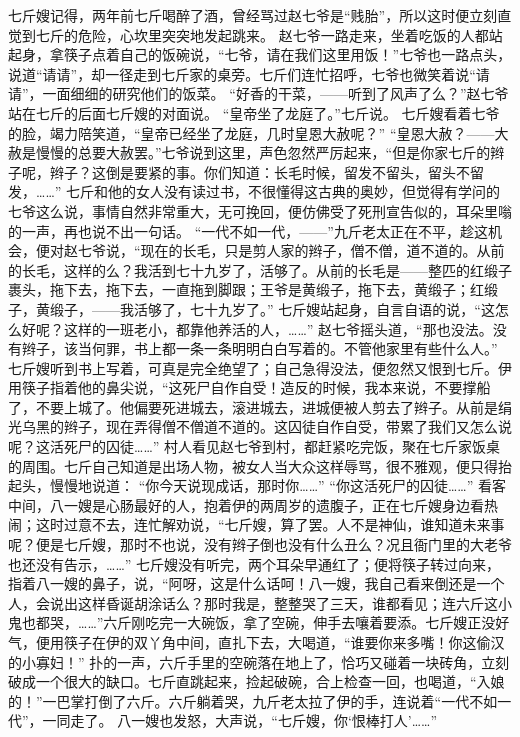 \documentclass[12pt,UTF8]{ctexbook}
\begin{document}
七斤嫂记得，两年前七斤喝醉了酒，曾经骂过赵七爷是“贱胎”，所以这时便立刻直觉到七斤的危险，心坎里突突地发起跳来。
赵七爷一路走来，坐着吃饭的人都站起身，拿筷子点着自己的饭碗说，“七爷，请在我们这里用饭！”七爷也一路点头，说道“请请”，却一径走到七斤家的桌旁。七斤们连忙招呼，七爷也微笑着说“请请”，一面细细的研究他们的饭菜。
“好香的干菜，——听到了风声了么？”赵七爷站在七斤的后面七斤嫂的对面说。
“皇帝坐了龙庭了。”七斤说。
七斤嫂看着七爷的脸，竭力陪笑道，“皇帝已经坐了龙庭，几时皇恩大赦呢？”
“皇恩大赦？——大赦是慢慢的总要大赦罢。”七爷说到这里，声色忽然严厉起来，“但是你家七斤的辫子呢，辫子？这倒是要紧的事。你们知道：长毛时候，留发不留头，留头不留发，……”
七斤和他的女人没有读过书，不很懂得这古典的奥妙，但觉得有学问的七爷这么说，事情自然非常重大，无可挽回，便仿佛受了死刑宣告似的，耳朵里嗡的一声，再也说不出一句话。
“一代不如一代，——”九斤老太正在不平，趁这机会，便对赵七爷说，“现在的长毛，只是剪人家的辫子，僧不僧，道不道的。从前的长毛，这样的么？我活到七十九岁了，活够了。从前的长毛是——整匹的红缎子裹头，拖下去，拖下去，一直拖到脚跟；王爷是黄缎子，拖下去，黄缎子；红缎子，黄缎子，——我活够了，七十九岁了。”
七斤嫂站起身，自言自语的说，“这怎么好呢？这样的一班老小，都靠他养活的人，……”
赵七爷摇头道，“那也没法。没有辫子，该当何罪，书上都一条一条明明白白写着的。不管他家里有些什么人。”
七斤嫂听到书上写着，可真是完全绝望了；自己急得没法，便忽然又恨到七斤。伊用筷子指着他的鼻尖说，“这死尸自作自受！造反的时候，我本来说，不要撑船了，不要上城了。他偏要死进城去，滚进城去，进城便被人剪去了辫子。从前是绢光乌黑的辫子，现在弄得僧不僧道不道的。这囚徒自作自受，带累了我们又怎么说呢？这活死尸的囚徒……”
村人看见赵七爷到村，都赶紧吃完饭，聚在七斤家饭桌的周围。七斤自己知道是出场人物，被女人当大众这样辱骂，很不雅观，便只得抬起头，慢慢地说道：
“你今天说现成话，那时你……”
“你这活死尸的囚徒……”
看客中间，八一嫂是心肠最好的人，抱着伊的两周岁的遗腹子，正在七斤嫂身边看热闹；这时过意不去，连忙解劝说，“七斤嫂，算了罢。人不是神仙，谁知道未来事呢？便是七斤嫂，那时不也说，没有辫子倒也没有什么丑么？况且衙门里的大老爷也还没有告示，……”
七斤嫂没有听完，两个耳朵早通红了；便将筷子转过向来，指着八一嫂的鼻子，说，“阿呀，这是什么话呵！八一嫂，我自己看来倒还是一个人，会说出这样昏诞胡涂话么？那时我是，整整哭了三天，谁都看见；连六斤这小鬼也都哭，……”六斤刚吃完一大碗饭，拿了空碗，伸手去嚷着要添。七斤嫂正没好气，便用筷子在伊的双丫角中间，直扎下去，大喝道，“谁要你来多嘴！你这偷汉的小寡妇！”
扑的一声，六斤手里的空碗落在地上了，恰巧又碰着一块砖角，立刻破成一个很大的缺口。七斤直跳起来，捡起破碗，合上检查一回，也喝道，“入娘的！”一巴掌打倒了六斤。六斤躺着哭，九斤老太拉了伊的手，连说着“一代不如一代”，一同走了。
八一嫂也发怒，大声说，“七斤嫂，你‘恨棒打人’……”
\end{document}
